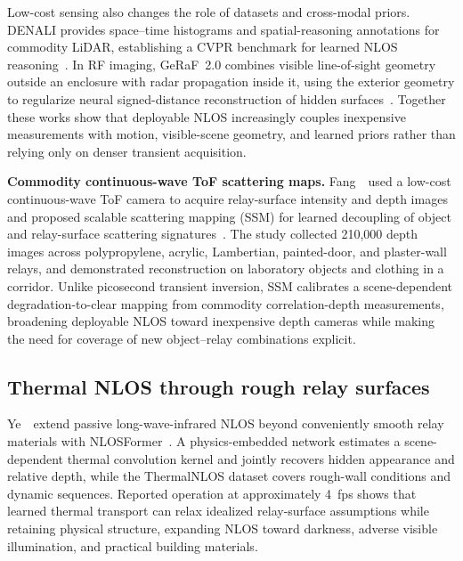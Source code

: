Low-cost sensing also changes the role of datasets and cross-modal priors. DENALI provides space--time histograms and spatial-reasoning annotations for commodity LiDAR, establishing a CVPR benchmark for learned NLOS reasoning~\cite{behariDENALI2026}. In RF imaging, GeRaF~2.0 combines visible line-of-sight geometry outside an enclosure with radar propagation inside it, using the exterior geometry to regularize neural signed-distance reconstruction of hidden surfaces~\cite{luSeeingThroughBoxes2026}. Together these works show that deployable NLOS increasingly couples inexpensive measurements with motion, visible-scene geometry, and learned priors rather than relying only on denser transient acquisition.

\vspace{0.8mm}
\noindent \textbf{Commodity continuous-wave ToF scattering maps.}
Fang~\etal~used a low-cost continuous-wave ToF camera to acquire relay-surface intensity and depth images and proposed scalable scattering mapping (SSM) for learned decoupling of object and relay-surface scattering signatures~\cite{fangScalableScatteringTOF2025}. The study collected 210,000 depth images across polypropylene, acrylic, Lambertian, painted-door, and plaster-wall relays, and demonstrated reconstruction on laboratory objects and clothing in a corridor. Unlike picosecond transient inversion, SSM calibrates a scene-dependent degradation-to-clear mapping from commodity correlation-depth measurements, broadening deployable NLOS toward inexpensive depth cameras while making the need for coverage of new object--relay combinations explicit.

\subsection{Thermal NLOS through rough relay surfaces}
Ye~\etal~extend passive long-wave-infrared NLOS beyond conveniently smooth relay materials with NLOSFormer~\cite{yeThermalNLOSFormer2026}. A physics-embedded network estimates a scene-dependent thermal convolution kernel and jointly recovers hidden appearance and relative depth, while the ThermalNLOS dataset covers rough-wall conditions and dynamic sequences. Reported operation at approximately 4~fps shows that learned thermal transport can relax idealized relay-surface assumptions while retaining physical structure, expanding NLOS toward darkness, adverse visible illumination, and practical building materials.

